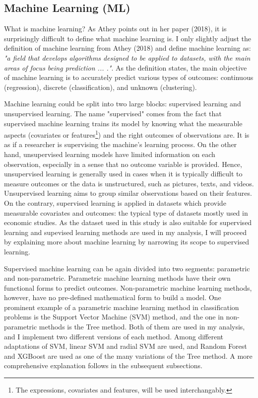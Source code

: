 \documentclass[11pt,a4paper,oneside]{article}
\begin{document}
\subsection{Machine Learning (ML)}
What is machine learning? As Athey points out in her paper (2018)\cite{athey2018impact}, it is surprisingly difficult to define what machine learning is. I only slightly adjust the definition of machine learning from Athey (2018)\cite{athey2018impact} and define machine learning as: \emph{"a field that develops algorithms designed to be applied to datasets, with the main areas of focus being prediction ... ."}. As the definition states, the main objective of machine learning is to accurately predict various types of outcomes: continuous (regression), discrete (classification), and unknown (clustering). 
\par
Machine learning could be split into two large blocks: supervised learning and unsupervised learning. The name "supervised" comes from the fact that supervised machine learning trains its model by knowing what the measurable aspects (covariates or features\footnote{The expressions, covariates and features, will be used interchangably.}) and the right outcomes of observations are. It is as if a researcher is supervising the machine's learning process. On the other hand, unsupervised learning models have limited information on each observation, especially in a sense that no outcome variable is provided. Hence, unsupervised learning is generally used in cases when it is typically difficult to measure outcomes or the data is unstructured, such as pictures, texts, and videos. Unsupervised learning aims to group similar observations based on their features. On the contrary, supervised learning is applied in datasets which provide measurable covariates and outcomes: the typical type of datasets mostly used in economic studies. As the dataset used in this study is also suitable for supervised learning and supevised learning methods are used in my analysis, I will proceed by explaining more about machine learning by narrowing its scope to supervised learning.
\par
Supervised machine learning can be again divided into two segments: parametric and non-parametric. Parametric machine learning methods have their own functional forms to predict outcomes. Non-parametric machine learning methods, however, have no pre-defined mathematical form to build a model. One prominent example of a parametric machine learning method in classification problems is the Support Vector Machine (SVM) method, and the one in non-parametric methods is the Tree method. Both of them are used in my analysis, and I implement two different versions of each method. Among different adaptations of SVM, linear SVM and radial SVM are used, and Random Forest and XGBoost are used as one of the many variations of the Tree method. A more comprehensive explanation follows in the subsequent subsections.
\end{document}
